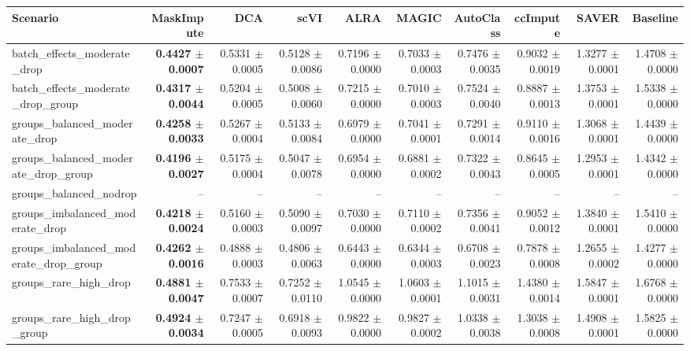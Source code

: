 \begin{tabular}{@{}lrrrrrrrrr@{}}
\toprule
Scenario & MaskImpute & DCA & scVI & ALRA & MAGIC & AutoClass & ccImpute & SAVER & Baseline \\
\midrule
batch\_effects\_moderate\_drop & \textbf{0.4427 $\pm$ 0.0007} & 0.5331 $\pm$ 0.0005 & 0.5128 $\pm$ 0.0086 & 0.7196 $\pm$ 0.0000 & 0.7033 $\pm$ 0.0003 & 0.7476 $\pm$ 0.0035 & 0.9032 $\pm$ 0.0019 & 1.3277 $\pm$ 0.0001 & 1.4708 $\pm$ 0.0000 \\
batch\_effects\_moderate\_drop\_group & \textbf{0.4317 $\pm$ 0.0044} & 0.5204 $\pm$ 0.0005 & 0.5008 $\pm$ 0.0060 & 0.7215 $\pm$ 0.0000 & 0.7010 $\pm$ 0.0003 & 0.7524 $\pm$ 0.0040 & 0.8887 $\pm$ 0.0013 & 1.3753 $\pm$ 0.0001 & 1.5338 $\pm$ 0.0000 \\
groups\_balanced\_moderate\_drop & \textbf{0.4258 $\pm$ 0.0033} & 0.5267 $\pm$ 0.0004 & 0.5133 $\pm$ 0.0084 & 0.6979 $\pm$ 0.0000 & 0.7041 $\pm$ 0.0001 & 0.7291 $\pm$ 0.0014 & 0.9110 $\pm$ 0.0016 & 1.3068 $\pm$ 0.0001 & 1.4439 $\pm$ 0.0000 \\
groups\_balanced\_moderate\_drop\_group & \textbf{0.4196 $\pm$ 0.0027} & 0.5175 $\pm$ 0.0004 & 0.5047 $\pm$ 0.0078 & 0.6954 $\pm$ 0.0000 & 0.6881 $\pm$ 0.0002 & 0.7322 $\pm$ 0.0043 & 0.8645 $\pm$ 0.0005 & 1.2953 $\pm$ 0.0001 & 1.4342 $\pm$ 0.0000 \\
groups\_balanced\_nodrop & -- & -- & -- & -- & -- & -- & -- & -- & -- \\
groups\_imbalanced\_moderate\_drop & \textbf{0.4218 $\pm$ 0.0024} & 0.5160 $\pm$ 0.0003 & 0.5090 $\pm$ 0.0097 & 0.7030 $\pm$ 0.0000 & 0.7110 $\pm$ 0.0002 & 0.7356 $\pm$ 0.0041 & 0.9052 $\pm$ 0.0012 & 1.3840 $\pm$ 0.0001 & 1.5410 $\pm$ 0.0000 \\
groups\_imbalanced\_moderate\_drop\_group & \textbf{0.4262 $\pm$ 0.0016} & 0.4888 $\pm$ 0.0003 & 0.4806 $\pm$ 0.0063 & 0.6443 $\pm$ 0.0000 & 0.6344 $\pm$ 0.0003 & 0.6708 $\pm$ 0.0023 & 0.7878 $\pm$ 0.0008 & 1.2655 $\pm$ 0.0002 & 1.4277 $\pm$ 0.0000 \\
groups\_rare\_high\_drop & \textbf{0.4881 $\pm$ 0.0047} & 0.7533 $\pm$ 0.0007 & 0.7252 $\pm$ 0.0110 & 1.0545 $\pm$ 0.0000 & 1.0603 $\pm$ 0.0001 & 1.1015 $\pm$ 0.0031 & 1.4380 $\pm$ 0.0014 & 1.5847 $\pm$ 0.0001 & 1.6768 $\pm$ 0.0000 \\
groups\_rare\_high\_drop\_group & \textbf{0.4924 $\pm$ 0.0034} & 0.7247 $\pm$ 0.0005 & 0.6918 $\pm$ 0.0093 & 0.9822 $\pm$ 0.0000 & 0.9827 $\pm$ 0.0002 & 1.0338 $\pm$ 0.0038 & 1.3038 $\pm$ 0.0008 & 1.4908 $\pm$ 0.0001 & 1.5825 $\pm$ 0.0000 \\

\end{tabular}
